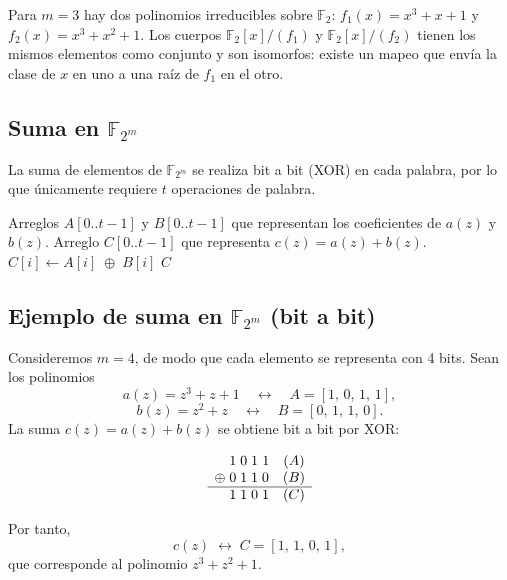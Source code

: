 \begin{ejemplo}\label{ej:isomorfismo_F8}
Para $m=3$ hay dos polinomios irreducibles sobre $\mathbb{F}_2$: $f_1(x)=x^3+x+1$ y $f_2(x)=x^3+x^2+1$. Los cuerpos $\mathbb{F}_2[x]/(f_1)$ y $\mathbb{F}_2[x]/(f_2)$ tienen los mismos elementos como conjunto y son isomorfos: existe un mapeo que envía la clase de $x$ en uno a una raíz de $f_1$ en el otro.
\end{ejemplo}

\subsection{Suma en \texorpdfstring{$\mathbb{F}_{2^m}$}{F2m}}
La suma de elementos de \(\mathbb{F}_{2^m}\) se realiza bit a bit (XOR) en cada palabra, por lo que únicamente requiere \(t\) operaciones de palabra.

\begin{algorithm}
\caption{Suma en \(\mathbb{F}_{2^m}\)}
\label{alg:add_f2m}
\begin{algorithmic}[1]
\Require Arreglos \(A[0..t-1]\) y \(B[0..t-1]\) que representan los coeficientes de \(a(z)\) y \(b(z)\).
\Ensure Arreglo \(C[0..t-1]\) que representa \(c(z)=a(z)+b(z)\).
  \State \(C[i] \leftarrow A[i]\;\oplus\;B[i]\)
\EndFor
\State \Return \(C\)
\end{algorithmic}
\end{algorithm}

\subsection*{Ejemplo de suma en \(\mathbb{F}_{2^m}\) (bit a bit)}

Consideremos \(m=4\), de modo que cada elemento se representa con 4 bits. Sean los polinomios  
\[
a(z) = z^3 + z + 1 \quad\longleftrightarrow\quad A = [1,\,0,\,1,\,1],
\]
\[
b(z) = z^2 + z \quad\longleftrightarrow\quad B = [0,\,1,\,1,\,0].
\]
La suma \(c(z)=a(z)+b(z)\) se obtiene bit a bit por XOR:

\[
\begin{array}{c@{\;}c@{\;}c@{\;}c@{\;}c}
   & 1 & 0 & 1 & 1  \quad(A)\\
\oplus & 0 & 1 & 1 & 0  \quad(B)\\\hline
   & 1 & 1 & 0 & 1  \quad(C)
\end{array}
\]

Por tanto,
\[
c(z) \;\longleftrightarrow\; C = [1,\,1,\,0,\,1],
\]
que corresponde al polinomio \(z^3 + z^2 + 1\).


